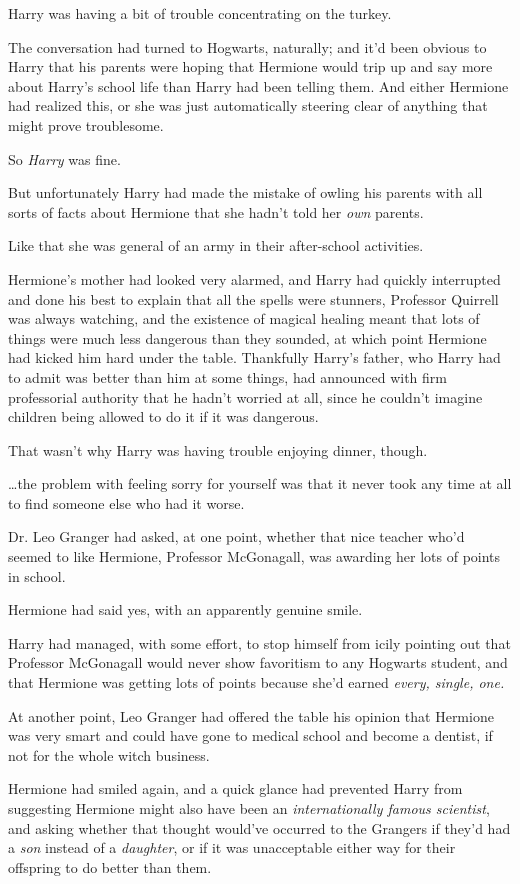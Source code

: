 Harry was having a bit of trouble concentrating on the turkey.

The conversation had turned to Hogwarts, naturally; and it'd been obvious to
Harry that his parents were hoping that Hermione would trip up and say more
about Harry's school life than Harry had been telling them. And either Hermione
had realized this, or she was just automatically steering clear of anything
that might prove troublesome.

So \emph{Harry} was fine.

But unfortunately Harry had made the mistake of owling his parents with all
sorts of facts about Hermione that she hadn't told her \emph{own} parents.

Like that she was general of an army in their after-school activities.

Hermione's mother had looked very alarmed, and Harry had quickly interrupted
and done his best to explain that all the spells were stunners, Professor
Quirrell was always watching, and the existence of magical healing meant that
lots of things were much less dangerous than they sounded, at which point
Hermione had kicked him hard under the table. Thankfully Harry's father, who
Harry had to admit was better than him at some things, had announced with firm
professorial authority that he hadn't worried at all, since he couldn't imagine
children being allowed to do it if it was dangerous.

That wasn't why Harry was having trouble enjoying dinner, though.

{\ldots}the problem with feeling sorry for yourself was that it never took any
time at all to find someone else who had it worse.

Dr. Leo Granger had asked, at one point, whether that nice teacher who'd seemed
to like Hermione, Professor McGonagall, was awarding her lots of points in
school.

Hermione had said yes, with an apparently genuine smile.

Harry had managed, with some effort, to stop himself from icily pointing out
that Professor McGonagall would never show favoritism to any Hogwarts student,
and that Hermione was getting lots of points because she'd earned \emph{every,
single, one.}

At another point, Leo Granger had offered the table his opinion that Hermione
was very smart and could have gone to medical school and become a dentist, if
not for the whole witch business.

Hermione had smiled again, and a quick glance had prevented Harry from
suggesting Hermione might also have been an \emph{internationally famous
scientist}, and asking whether that thought would've occurred to the Grangers
if they'd had a \emph{son} instead of a \emph{daughter}, or if it was
unacceptable either way for their offspring to do better than them.


